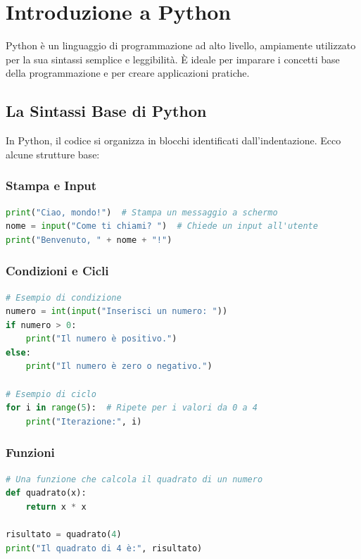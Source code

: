 \documentclass[a4paper,12pt]{report}
\begin{document}
\section{Introduzione a Python}
Python è un linguaggio di programmazione ad alto livello, ampiamente utilizzato per la sua sintassi semplice e leggibilità. È ideale per imparare i concetti base della programmazione e per creare applicazioni pratiche.

\subsection{La Sintassi Base di Python}
In Python, il codice si organizza in blocchi identificati dall'indentazione. Ecco alcune strutture base:

\subsubsection*{Stampa e Input}
\begin{lstlisting}[language=Python, caption={Esempio di stampa e input}]
print("Ciao, mondo!")  # Stampa un messaggio a schermo
nome = input("Come ti chiami? ")  # Chiede un input all'utente
print("Benvenuto, " + nome + "!")
\end{lstlisting}

\subsubsection*{Condizioni e Cicli}
\begin{lstlisting}[language=Python, caption={Esempio di condizioni e cicli}]
# Esempio di condizione
numero = int(input("Inserisci un numero: "))
if numero > 0:
    print("Il numero è positivo.")
else:
    print("Il numero è zero o negativo.")

# Esempio di ciclo
for i in range(5):  # Ripete per i valori da 0 a 4
    print("Iterazione:", i)
\end{lstlisting}

\subsubsection*{Funzioni}
\begin{lstlisting}[language=Python, caption={Esempio di funzione}]
# Una funzione che calcola il quadrato di un numero
def quadrato(x):
    return x * x

risultato = quadrato(4)
print("Il quadrato di 4 è:", risultato)
\end{lstlisting}
\end{document}
